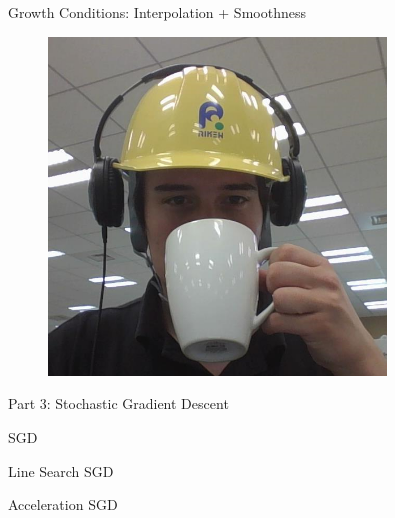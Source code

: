 \documentclass[mathserif,notheorems, hyperref={colorlinks, citecolor=blue, urlcolor=blue, linkcolor=blue}]{beamer}
\begin{document}
\begin{frame}{Growth Conditions: Interpolation + Smoothness}
\begin{center}
\begin{minipage}[t]{0.15\textwidth}
\begin{figure}[t]
                \vspace{0.5ex}

                \includegraphics[width=0.8\textwidth]{collaborators/fred}
            \end{figure} 
        \end{minipage}
        
    \end{center}
    \end{frame}


    
    \begin{frame}
       \begin{center}
          \huge Part 3: Stochastic Gradient Descent 
       \end{center} 
    \end{frame}
    

    \begin{frame}{SGD}
       
    \end{frame}

    \begin{frame}{Line Search}
       SGD 
    \end{frame}

    \begin{frame}{Acceleration}
       SGD 
    \end{frame}
\end{document}
